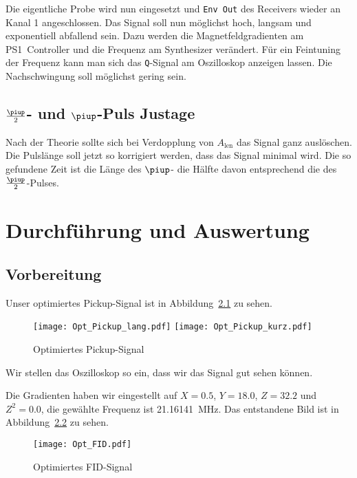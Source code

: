 Die eigentliche Probe wird nun eingesetzt und \texttt{Env Out} des Receivers
wieder an Kanal 1 angeschlossen. Das Signal soll nun möglichst hoch, langsam
und exponentiell abfallend sein. Dazu werden die Magnetfeldgradienten am
PS1~Controller und die Frequenz am Synthesizer verändert. Für ein Feintuning
der Frequenz kann man sich das \texttt{Q}-Signal am Oszilloskop anzeigen
lassen. Die Nachschwingung soll möglichst gering sein.

\section{$\frac\piup2$- und $\piup$-Puls Justage}

Nach der Theorie sollte sich bei Verdopplung von $A_\text{len}$ das Signal
ganz auslöschen. Die Pulslänge soll jetzt so korrigiert werden, dass das
Signal minimal wird. Die so gefundene Zeit ist die Länge des $\piup$- die
Hälfte davon entsprechend die des $\frac{\piup}{2}$-Pulses.

\chapter{Durchführung und Auswertung}

\section{Vorbereitung}

Unser optimiertes Pickup-Signal ist in Abbildung~\ref{fig:pickup}
zu sehen.

\begin{figure}
    \centering
    \texttt{[image: Opt\_Pickup\_lang.pdf]}
    \texttt{[image: Opt\_Pickup\_kurz.pdf]}
    \caption{%
    Optimiertes Pickup-Signal
    }
    \label{fig:pickup}
\end{figure}

Wir stellen das Oszilloskop so ein, dass wir das Signal gut sehen können.

Die Gradienten haben wir eingestellt auf $X = \num{0.5}$, $Y = \num{18.0}$, $Z
= \num{32.2}$ und $Z^2 = \num{0.0}$, die gewählte Frequenz ist
\SI{21.16141}{\mega\hertz}. Das entstandene Bild ist in Abbildung~\ref{fig:FID}
zu sehen.

\begin{figure}
    \centering
    \texttt{[image: Opt\_FID.pdf]}
    \caption{%
    Optimiertes FID-Signal
    }
    \label{fig:FID}
\end{figure}

